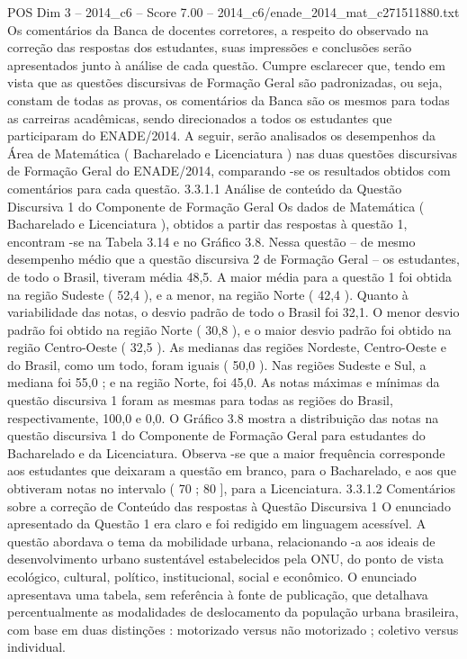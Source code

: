 \begin{textsample}{POS Dim 3 – 2014\_c6 – Score 7.00 – 2014\_c6/enade\_2014\_mat\_c271511880.txt}
Os comentários da Banca de docentes corretores, a respeito do observado na correção das respostas dos estudantes, suas impressões e conclusões serão apresentados junto à análise de cada questão.
Cumpre esclarecer que, tendo em vista que as questões discursivas de Formação Geral são padronizadas, ou seja, constam de todas as provas, os comentários da Banca são os mesmos para todas as carreiras acadêmicas, sendo direcionados a todos os estudantes que participaram do ENADE/2014.
A seguir, serão analisados os desempenhos da Área de Matemática ( Bacharelado e Licenciatura ) nas duas questões discursivas de Formação Geral do ENADE/2014, comparando -se os resultados obtidos com comentários para cada questão. 3.3.1.1 Análise de conteúdo da Questão Discursiva 1 do Componente de Formação Geral Os dados de Matemática ( Bacharelado e Licenciatura ), obtidos a partir das respostas à questão 1, encontram -se na Tabela 3.14 e no Gráfico 3.8.
Nessa questão – de mesmo desempenho médio que a questão discursiva 2 de Formação Geral – os estudantes, de todo o Brasil, tiveram média 48,5.
A maior média para a questão 1 foi obtida na região Sudeste ( 52,4 ), e a menor, na região Norte ( 42,4 ).
Quanto à variabilidade das notas, o desvio padrão de todo o Brasil foi 32,1.
O menor desvio padrão foi obtido na região Norte ( 30,8 ), e o maior desvio padrão foi obtido na região Centro-Oeste ( 32,5 ).
As medianas das regiões Nordeste, Centro-Oeste e do Brasil, como um todo, foram iguais ( 50,0 ).
Nas regiões Sudeste e Sul, a mediana foi 55,0 ; e na região Norte, foi 45,0.
As notas máximas e mínimas da questão discursiva 1 foram as mesmas para todas as regiões do Brasil, respectivamente, 100,0 e 0,0.
O Gráfico 3.8 mostra a distribuição das notas na questão discursiva 1 do Componente de Formação Geral para estudantes do Bacharelado e da Licenciatura.
Observa -se que a maior frequência corresponde aos estudantes que deixaram a questão em branco, para o Bacharelado, e aos que obtiveram notas no intervalo ( 70 ; 80 ], para a Licenciatura. 3.3.1.2 Comentários sobre a correção de Conteúdo das respostas à Questão Discursiva 1 O enunciado apresentado da Questão 1 era claro e foi redigido em linguagem acessível.
A questão abordava o tema da mobilidade urbana, relacionando -a aos ideais de desenvolvimento urbano sustentável estabelecidos pela ONU, do ponto de vista ecológico, cultural, político, institucional, social e econômico.
O enunciado apresentava uma tabela, sem referência à fonte de publicação, que detalhava percentualmente as modalidades de deslocamento da população urbana brasileira, com base em duas distinções : motorizado versus não motorizado ; coletivo versus individual.

\end{textsample}

